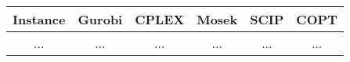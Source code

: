 \documentclass{standalone}
\begin{document}
\begin{tabular}{||c || c|c|c|c|c||} 
    \hline
    Instance & \textbf{Gurobi} & \textbf{CPLEX} & \textbf{Mosek} & \textbf{SCIP} & \textbf{COPT} \\ [0.5ex] 
    \hline
    ... & ... & ... & ... & ... & ... \\
    \hline
\end{tabular}
\end{document}
